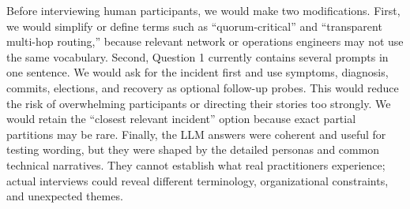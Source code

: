 \documentclass[11pt,a4paper]{article}
\begin{document}
Before interviewing human participants, we would make two modifications. First, we would simplify or define terms such as ``quorum-critical'' and ``transparent multi-hop routing,'' because relevant network or operations engineers may not use the same vocabulary. Second, Question 1 currently contains several prompts in one sentence. We would ask for the incident first and use symptoms, diagnosis, commits, elections, and recovery as optional follow-up probes. This would reduce the risk of overwhelming participants or directing their stories too strongly. We would retain the ``closest relevant incident'' option because exact partial partitions may be rare. Finally, the LLM answers were coherent and useful for testing wording, but they were shaped by the detailed personas and common technical narratives. They cannot establish what real practitioners experience; actual interviews could reveal different terminology, organizational constraints, and unexpected themes.
\end{document}
